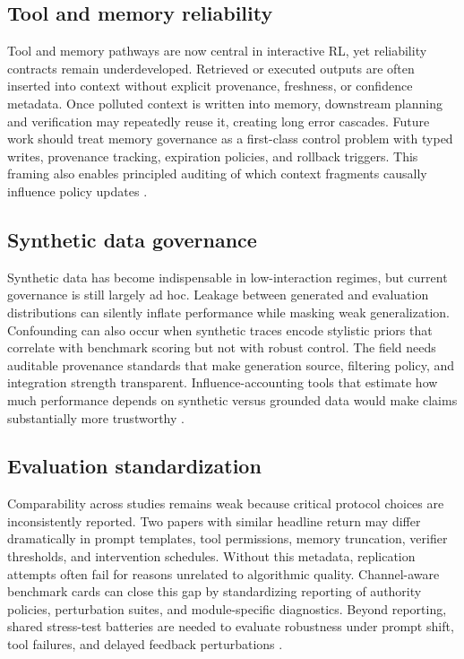 ﻿\documentclass[conference]{IEEEtran}
\begin{document}
\subsection{Tool and memory reliability}
Tool and memory pathways are now central in interactive RL, yet reliability contracts remain underdeveloped. Retrieved or executed outputs are often inserted into context without explicit provenance, freshness, or confidence metadata. Once polluted context is written into memory, downstream planning and verification may repeatedly reuse it, creating long error cascades. Future work should treat memory governance as a first-class control problem with typed writes, provenance tracking, expiration policies, and rollback triggers. This framing also enables principled auditing of which context fragments causally influence policy updates \cite{arxiv_p_2404_03648,arxiv_p_2511_14460,arxiv_p_2602_00994,arxiv_p_2601_07264}.

\subsection{Synthetic data governance}
Synthetic data has become indispensable in low-interaction regimes, but current governance is still largely ad hoc. Leakage between generated and evaluation distributions can silently inflate performance while masking weak generalization. Confounding can also occur when synthetic traces encode stylistic priors that correlate with benchmark scoring but not with robust control. The field needs auditable provenance standards that make generation source, filtering policy, and integration strength transparent. Influence-accounting tools that estimate how much performance depends on synthetic versus grounded data would make claims substantially more trustworthy \cite{arxiv_p_2310_20587,arxiv_p_2505_18098,arxiv_p_2601_08107,arxiv_p_2602_02137}.

\subsection{Evaluation standardization}
Comparability across studies remains weak because critical protocol choices are inconsistently reported. Two papers with similar headline return may differ dramatically in prompt templates, tool permissions, memory truncation, verifier thresholds, and intervention schedules. Without this metadata, replication attempts often fail for reasons unrelated to algorithmic quality. Channel-aware benchmark cards can close this gap by standardizing reporting of authority policies, perturbation suites, and module-specific diagnostics. Beyond reporting, shared stress-test batteries are needed to evaluate robustness under prompt shift, tool failures, and delayed feedback perturbations \cite{arxiv_p_2411_02337,doi_p_10_3390_app14198868,arxiv_p_2510_16720,arxiv_p_2601_12762}.
\end{document}
